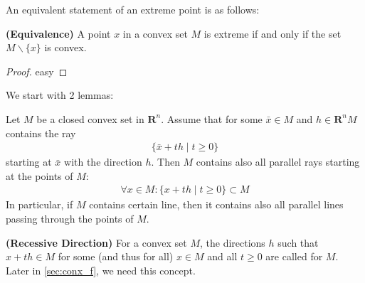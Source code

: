 \documentclass{article}
\newcommand{\bfs}[1]{\textbf{({#1}) }}
\begin{document}
An equivalent statement of an extreme point is as follows:
\begin{lema}{\bfs{Equivalence}}
 A point $x$ in a convex set $M$ is extreme if and only if the set $M \backslash\{x\}$ is convex.
\end{lema}
\begin{proof}\color{ForestGreen}
easy
\end{proof}
We start with 2 lemmas:
\begin{lema}\label{lem:allline}
 Let $M$ be a closed convex set in $\mathbf{R}^{n} .$ Assume that for some $\bar{x} \in M$ and $h \in \mathbf{R}^{n} M$ contains the ray
\begin{align*}
\{\bar{x}+t h \mid t \geq 0\}
\end{align*}
starting at $\bar{x}$ with the direction $h$. Then $M$ contains also all parallel rays starting at the points of $M:$
\begin{align*}
\forall x \in M:\{x+t h \mid t \geq 0\} \subset M
\end{align*}
In particular, if $M$ contains certain line, then it contains also all parallel lines passing through the points of $M$.

\end{lema} 
\begin{defa}{\bfs{Recessive Direction}}\label{def:recessive_dir}
  For a convex set $M$, the directions $h$ such that $x+t h \in M$ for some (and thus for all) $x \in M$ and all $t \geq 0$ are called  for $M$. Later in \cref{sec:conx_f}, we need this concept.
\end{defa}
\end{document}

